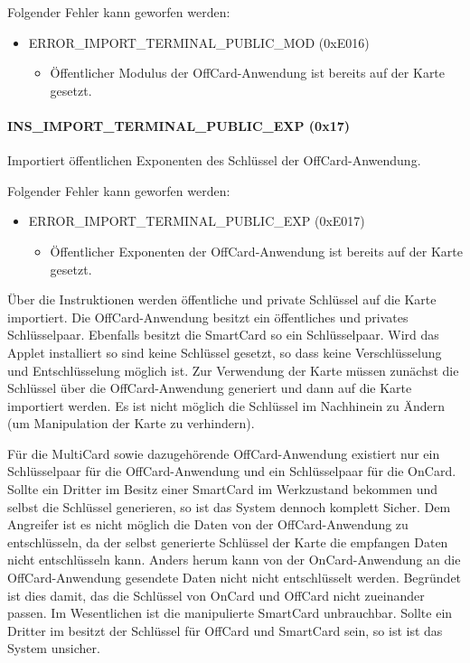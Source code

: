 Folgender Fehler kann geworfen werden:
\begin{itemize}
	\item ERROR\_IMPORT\_TERMINAL\_PUBLIC\_MOD (0xE016)
	\begin{itemize}
		\item Öffentlicher Modulus der OffCard-Anwendung ist bereits auf der Karte gesetzt.
	\end{itemize}
\end{itemize}
\paragraph{INS\_IMPORT\_TERMINAL\_PUBLIC\_EXP (0x17)} Importiert öffentlichen Exponenten des Schlüssel der OffCard-Anwendung.

Folgender Fehler kann geworfen werden:
\begin{itemize}
	\item ERROR\_IMPORT\_TERMINAL\_PUBLIC\_EXP (0xE017)
	\begin{itemize}
		\item Öffentlicher Exponenten der OffCard-Anwendung ist bereits auf der Karte gesetzt.
	\end{itemize}
\end{itemize}

Über die Instruktionen werden öffentliche und private Schlüssel auf die Karte importiert.
Die OffCard-Anwendung besitzt ein öffentliches und privates Schlüsselpaar.
Ebenfalls besitzt die SmartCard so ein Schlüsselpaar.
Wird das Applet installiert so sind keine Schlüssel gesetzt, so dass keine Verschlüsselung und Entschlüsselung möglich ist.
Zur Verwendung der Karte müssen zunächst die Schlüssel über die OffCard-Anwendung generiert und dann auf die Karte importiert werden.
Es ist nicht möglich die Schlüssel im Nachhinein zu Ändern (um Manipulation der Karte zu verhindern).

Für die MultiCard sowie dazugehörende OffCard-Anwendung existiert nur ein Schlüsselpaar für die OffCard-Anwendung und ein Schlüsselpaar für die OnCard.
Sollte ein Dritter im Besitz einer SmartCard im Werkzustand bekommen und selbst die Schlüssel generieren, so ist das System dennoch komplett Sicher.
Dem Angreifer ist es nicht möglich die Daten von der OffCard-Anwendung zu entschlüsseln, da der selbst generierte Schlüssel der Karte die empfangen Daten nicht entschlüsseln kann.
Anders herum kann von der OnCard-Anwendung an die OffCard-Anwendung gesendete Daten nicht nicht entschlüsselt werden.
Begründet ist dies damit, das die Schlüssel von OnCard und OffCard nicht zueinander passen.
Im Wesentlichen ist die manipulierte SmartCard unbrauchbar.
Sollte ein Dritter im besitzt der Schlüssel für OffCard und SmartCard sein, so ist ist das System unsicher.

